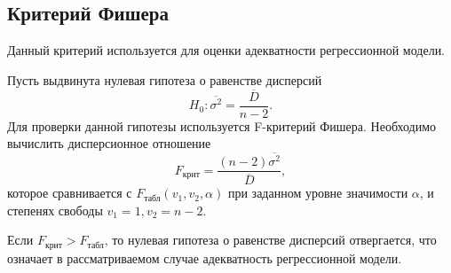 
\subsection*{Критерий Фишера} %
\label{subsec:fisher}

Данный критерий используется для оценки адекватности регрессионной модели.

Пусть выдвинута нулевая гипотеза о равенстве дисперсий 
\begin{equation*}
	H_0: \overline{\sigma^2} = \frac{\overline{D}}{n - 2}.
\end{equation*}
Для проверки данной гипотезы используется F-критерий Фишера. Необходимо вычислить дисперсионное отношение 
\begin{equation*}
	F_{\textrm{крит}} = \frac{(n-2)\overline{\sigma^2}}{\overline{D}},	
\end{equation*}
которое сравнивается с $F_{\textrm{табл}}(v_1, v_2, \alpha)$ при заданном уровне значимости $\alpha$, и степенях свободы $v_1=1, v_2=n - 2$. 

Если $F_{\textrm{крит}} > F_{\textrm{табл}}$, то нулевая гипотеза о равенстве дисперсий отвергается, что означает в рассматриваемом случае адекватность регрессионной модели.


